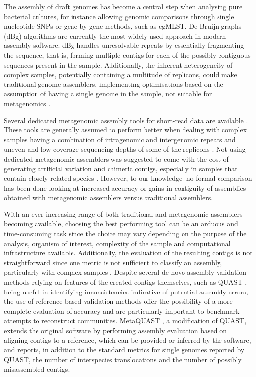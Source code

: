 The assembly of draft genomes has become a central step when analysing pure bacterial cultures, for instance allowing genomic comparisons through single nucleotide \ac{SNP}s or gene-by-gene methods, such as \ac{cgMLST}. De Bruijn graphs (dBg) algorithms are currently the most widely used approach in modern assembly software. dBg handles unresolvable repeats by essentially fragmenting the sequence, that is, forming multiple contigs for each of the possibly contiguous sequences present in the sample. Additionally, the inherent heterogeneity of complex samples, potentially containing a multitude of replicons, could make traditional genome assemblers, implementing optimisations based on the assumption of having a single genome in the sample, not suitable for metagenomics \cite{ayling_new_2020}.

Several dedicated metagenomic assembly tools for short-read data are available \cite{ayling_new_2020}. These tools are generally assumed to perform better when dealing with complex samples having a combination of intragenomic and intergenomic repeats and uneven and low coverage sequencing depths of some of the replicons \cite{olson_metagenomic_2019}. Not using dedicated metagenomic assemblers was suggested to come with the cost of generating artificial variation and chimeric contigs, especially in samples that contain closely related species \cite{teeling_current_2012}. However, to our knowledge, no formal comparison has been done looking at increased accuracy or gains in contiguity of assemblies obtained with metagenomic assemblers versus traditional assemblers.

With an ever-increasing range of both traditional and metagenomic assemblers becoming available, choosing the best performing tool can be an arduous and time-consuming task since the choice may vary depending on the purpose of the analysis, organism of interest, complexity of the sample and computational infrastructure available. Additionally, the evaluation of the resulting contigs is not straightforward since one metric is not sufficient to classify an assembly, particularly with complex samples \cite{olson_metagenomic_2019,bradnam_assemblathon_2013}. Despite several de novo assembly validation methods relying on features of the created contigs themselves, such as QUAST \cite{gurevich_quast_2013}, being useful in identifying inconsistencies indicative of potential assembly errors, the use of reference-based validation methods offer the possibility of a more complete evaluation of accuracy and are particularly important to benchmark attempts to reconstruct communities. MetaQUAST \cite{bradnam_assemblathon_2013}, a modification of QUAST, extends the original software by performing assembly evaluation based on aligning contigs to a reference, which can be provided or inferred by the software, and reports, in addition to the standard metrics for single genomes reported by QUAST, the number of interspecies translocations and the number of possibly misassembled contigs.

